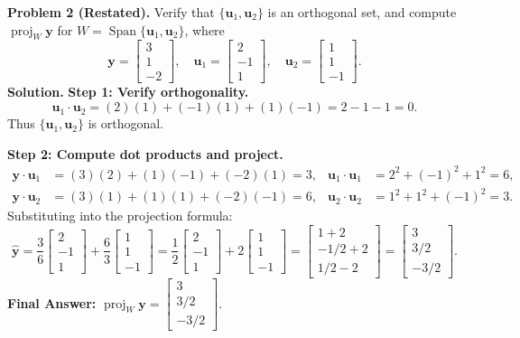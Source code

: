 \documentclass[11pt, letterpaper]{article}
\theoremstyle{definition}
\theoremstyle{remark}
\begin{document}
\medskip
\textbf{Problem 2 (Restated).} Verify that $\{\mathbf{u}_1, \mathbf{u}_2\}$ is an orthogonal set, and compute $\operatorname{proj}_W \mathbf{y}$ for $W = \operatorname{Span}\{\mathbf{u}_1, \mathbf{u}_2\}$, where
\[
\mathbf{y} = \begin{bmatrix} 3 \\ 1 \\ -2 \end{bmatrix}, \quad \mathbf{u}_1 = \begin{bmatrix} 2 \\ -1 \\ 1 \end{bmatrix}, \quad \mathbf{u}_2 = \begin{bmatrix} 1 \\ 1 \\ -1 \end{bmatrix}.
\]
\textbf{Solution.}
\textbf{Step 1: Verify orthogonality.}
\[
\mathbf{u}_1 \cdot \mathbf{u}_2 = (2)(1) + (-1)(1) + (1)(-1) = 2 - 1 - 1 = 0.
\]
Thus $\{\mathbf{u}_1, \mathbf{u}_2\}$ is orthogonal.

\textbf{Step 2: Compute dot products and project.}
\begin{align*}
\mathbf{y} \cdot \mathbf{u}_1 &= (3)(2) + (1)(-1) + (-2)(1) = 3, & \mathbf{u}_1 \cdot \mathbf{u}_1 &= 2^2 + (-1)^2 + 1^2 = 6, \\
\mathbf{y} \cdot \mathbf{u}_2 &= (3)(1) + (1)(1) + (-2)(-1) = 6, & \mathbf{u}_2 \cdot \mathbf{u}_2 &= 1^2 + 1^2 + (-1)^2 = 3.
\end{align*}
Substituting into the projection formula:
\[
\hat{\mathbf{y}} = \frac{3}{6}\begin{bmatrix} 2 \\ -1 \\ 1 \end{bmatrix} + \frac{6}{3}\begin{bmatrix} 1 \\ 1 \\ -1 \end{bmatrix} = \frac{1}{2}\begin{bmatrix} 2 \\ -1 \\ 1 \end{bmatrix} + 2\begin{bmatrix} 1 \\ 1 \\ -1 \end{bmatrix} = \begin{bmatrix} 1 + 2 \\ -1/2 + 2 \\ 1/2 - 2 \end{bmatrix} = \begin{bmatrix} 3 \\ 3/2 \\ -3/2 \end{bmatrix}.
\]
\textbf{Final Answer:} $\operatorname{proj}_W \mathbf{y} = \begin{bmatrix} 3 \\ 3/2 \\ -3/2 \end{bmatrix}$.
\end{document}
